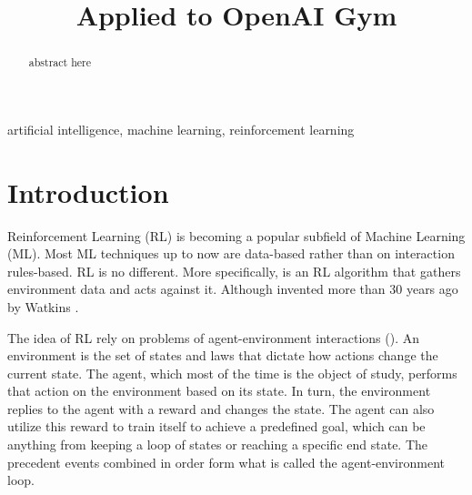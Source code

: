 \documentclass[conference]{IEEEtran}
\begin{document}
\title{{\QLearning} Applied to OpenAI Gym}
\author{
}
\maketitle


\begin{abstract}
    abstract here
\end{abstract}

\begin{IEEEkeywords}
    artificial intelligence, machine learning, reinforcement learning
\end{IEEEkeywords}


\section{Introduction}

Reinforcement Learning (RL) is becoming a popular subfield of Machine Learning (ML).
Most ML techniques up to now are data-based rather than on interaction rules-based.
RL is no different.
More specifically, {\Qlearning} is an RL algorithm that gathers environment data and acts against it.
Although invented more than 30 years ago by Watkins \cite{Watkins:1989}.

The idea of RL rely on problems of agent-environment interactions ().
An environment is the set of states and laws that dictate how actions change the current state.
The agent, which most of the time is the object of study, performs that action on the environment based on its state.
In turn, the environment replies to the agent with a reward and changes the state.
The agent can also utilize this reward to train itself to achieve a predefined goal, which can be anything from keeping a loop of states or reaching a specific end state.
The precedent events combined in order form what is called the agent-environment loop.
\end{document}
